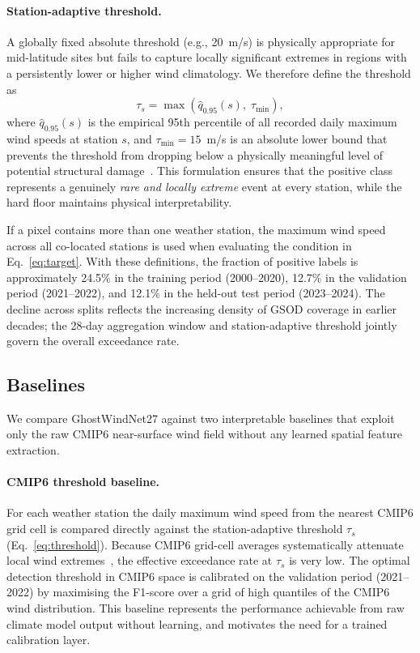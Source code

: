 \documentclass{article}
\begin{document}
\paragraph{Station-adaptive threshold.} A globally fixed absolute threshold (e.g., 20~m/s) is physically appropriate for mid-latitude sites but fails to capture locally significant extremes in regions with a persistently lower or higher wind climatology. We therefore define the threshold as
\begin{equation}
    \tau_s = \max\!\left(\hat{q}_{0.95}(s),\; \tau_{\min}\right),
    \label{eq:threshold}
\end{equation}
where $\hat{q}_{0.95}(s)$ is the empirical 95th percentile of all recorded daily maximum wind speeds at station $s$, and $\tau_{\min} = 15$~m/s is an absolute lower bound that prevents the threshold from dropping below a physically meaningful level of potential structural damage~\cite{wallbrink2009historical}. This formulation ensures that the positive class represents a genuinely \emph{rare and locally extreme} event at every station, while the hard floor maintains physical interpretability.

If a pixel contains more than one weather station, the maximum wind speed across all co-located stations is used when evaluating the condition in Eq.~\ref{eq:target}. With these definitions, the fraction of positive labels is approximately 24.5\% in the training period (2000--2020), 12.7\% in the validation period (2021--2022), and 12.1\% in the held-out test period (2023--2024). The decline across splits reflects the increasing density of GSOD coverage in earlier decades; the 28-day aggregation window and station-adaptive threshold jointly govern the overall exceedance rate.

\subsection{Baselines}
\label{sec:Baseline}

We compare GhostWindNet27 against two interpretable baselines that exploit only the raw CMIP6 near-surface wind field without any learned spatial feature extraction.

\paragraph{CMIP6 threshold baseline.}
For each weather station the daily maximum wind speed from the nearest CMIP6 grid cell is compared directly against the station-adaptive threshold $\tau_s$ (Eq.~\ref{eq:threshold}). Because CMIP6 grid-cell averages systematically attenuate local wind extremes~\cite{shenCMIP6Wind2022}, the effective exceedance rate at $\tau_s$ is very low. The optimal detection threshold in CMIP6 space is calibrated on the validation period (2021--2022) by maximising the F1-score over a grid of high quantiles of the CMIP6 wind distribution. This baseline represents the performance achievable from raw climate model output without learning, and motivates the need for a trained calibration layer.
\end{document}
